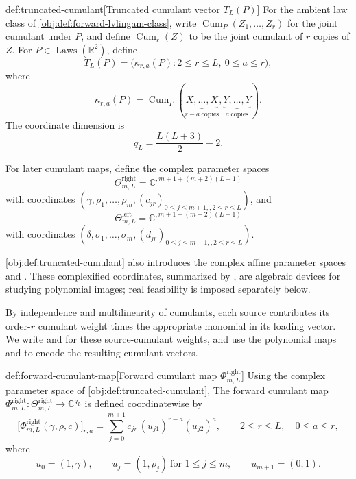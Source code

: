 \begin{definitionv}{def:truncated-cumulant}[Truncated cumulant vector \(T_L(P)\)]
For the ambient law class of \cref{obj:def:forward-lvlingam-class}, write \(\operatorname{Cum}_P(Z_1,\ldots,Z_r)\) for the joint cumulant under \(P\), and define \(\operatorname{Cum}_r(Z)\) to be the joint cumulant of \(r\) copies of \(Z\). For \(P\in \operatorname{Laws}(\mathbb R^2)\), define
\[
T_L(P)=\bigl(\kappa_{r,a}(P):2\le r\le L,\ 0\le a\le r\bigr),
\]
where
\[
\kappa_{r,a}(P)
=
\operatorname{Cum}_P(\underbrace{X,\ldots,X}_{r-a\ \mathrm{copies}},
\underbrace{Y,\ldots,Y}_{a\ \mathrm{copies}}).
\]
The coordinate dimension is
\[
q_L=\frac{L(L+3)}{2}-2.
\]

For later cumulant maps, define the complex parameter spaces
\[
\Theta^{\mathrm{right}}_{m,L}
=\mathbb C^{,m+1+(m+2)(L-1)}
\]
with coordinates \((\gamma,\rho_1,\ldots,\rho_m,(c_{jr})_{0\le j\le m+1,,2\le r\le L})\), and
\[
\Theta^{\mathrm{left}}_{m,L}
=\mathbb C^{,m+1+(m+2)(L-1)}
\]
with coordinates \((\delta,\sigma_1,\ldots,\sigma_m,(d_{jr})_{0\le j\le m+1,,2\le r\le L})\).
\end{definitionv}

\cref{obj:def:truncated-cumulant} also introduces the complex affine parameter spaces  and . These complexified coordinates, summarized by , are algebraic devices for studying polynomial images; real feasibility is imposed separately below.

By independence and multilinearity of cumulants, each source contributes its order-\(r\) cumulant weight times the appropriate monomial in its loading vector. We write  and  for these source-cumulant weights, and use the polynomial maps  and  to encode the resulting cumulant vectors.

\begin{definitionv}{def:forward-cumulant-map}[Forward cumulant map \(\Phi^{\mathrm{right}}_{m,L}\)]
Using the complex parameter space of \cref{obj:def:truncated-cumulant}, The forward cumulant map \(\Phi^{\mathrm{right}}_{m,L}:\Theta^{\mathrm{right}}_{m,L}\to\mathbb C^{q_L}\) is defined coordinatewise by
\[
\bigl[\Phi^{\mathrm{right}}_{m,L}(\gamma,\rho,c)\bigr]_{r,a}
=
\sum_{j=0}^{m+1}
c_{jr}\,(u_{j1})^{r-a}(u_{j2})^a,
\qquad
2\le r\le L,\quad 0\le a\le r,
\]
where
\[
u_0=(1,\gamma),\qquad
u_j=(1,\rho_j)\ \text{for }1\le j\le m,\qquad
u_{m+1}=(0,1).
\]
\end{definitionv}

